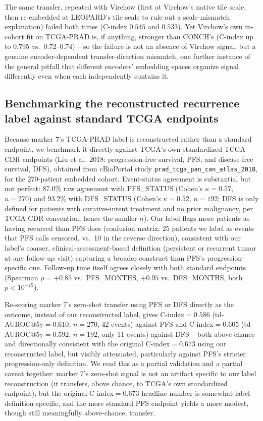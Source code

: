 The same transfer, repeated with Virchow (first at Virchow's native tile scale, then
re-embedded at LEOPARD's tile scale to rule out a scale-mismatch explanation) failed both
times (C-index $0.545$ and $0.533$). Yet Virchow's own in-cohort fit on TCGA-PRAD is, if
anything, stronger than CONCH's (C-index up to $0.795$ vs.\ $0.72$--$0.74$) -- so the failure
is not an absence of Virchow signal, but a genuine encoder-dependent transfer-direction
mismatch, one further instance of the general pitfall that different encoders' embedding
spaces organize signal differently even when each independently contains it.

\subsection{Benchmarking the reconstructed recurrence label against standard TCGA endpoints}
\label{sec:res-label-benchmark}

Because marker 7's TCGA-PRAD label is reconstructed rather than a standard endpoint, we
benchmark it directly against TCGA's own standardized TCGA-CDR endpoints (Liu et al.\ 2018:
progression-free survival, PFS, and disease-free survival, DFS), obtained from cBioPortal study
\texttt{prad\_tcga\_pan\_can\_atlas\_2018}, for the 270-patient embedded cohort. Event-status
agreement is substantial but not perfect: 87.0\% raw agreement with PFS\_STATUS (Cohen's
$\kappa=0.57$, $n=270$) and 93.2\% with DFS\_STATUS (Cohen's $\kappa=0.52$, $n=192$; DFS is
only defined for patients with curative-intent treatment and no prior malignancy, per TCGA-CDR
convention, hence the smaller $n$). Our label flags more patients as having recurred than PFS
does (confusion matrix: 25 patients we label as events that PFS calls censored, vs.\ 10 in the
reverse direction), consistent with our label's coarser, clinical-assessment-based definition
(persistent or recurrent tumor at any follow-up visit) capturing a broader construct than PFS's
progression-specific one. Follow-up time itself agrees closely with both standard endpoints
(Spearman $\rho=+0.85$ vs.\ PFS\_MONTHS, $+0.95$ vs.\ DFS\_MONTHS, both $p<10^{-75}$).

Re-scoring marker 7's zero-shot transfer using PFS or DFS directly as the outcome, instead of
our reconstructed label, gives C-index$=0.586$ (td-AUROC@5y$=0.610$, $n=270$, 42 events) against
PFS and C-index$=0.605$ (td-AUROC@5y$=0.592$, $n=192$, only 11 events) against DFS -- both
above chance and directionally consistent with the original C-index$=0.673$ using our
reconstructed label, but visibly attenuated, particularly against PFS's stricter
progression-only definition. We read this as a partial validation and a partial caveat
together: marker 7's zero-shot signal is not an artifact specific to our label reconstruction
(it transfers, above chance, to TCGA's own standardized endpoint), but the original
C-index$=0.673$ headline number is somewhat label-definition-specific, and the more standard
PFS endpoint yields a more modest, though still meaningfully above-chance, transfer.

